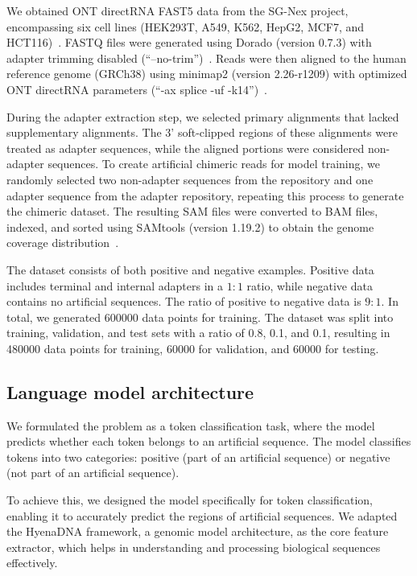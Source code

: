 \documentclass[pdflatex, sn-mathphys-num, lineno]{sn-jnl}%
\theoremstyle{thmstyleone}%
\theoremstyle{thmstyletwo}%
\theoremstyle{thmstylethree}%
\begin{document}
We obtained ONT directRNA FAST5 data from the SG-Nex project, encompassing six cell lines (HEK293T, A549, K562, HepG2, MCF7, and HCT116)~\cite{chen2021systematic}.
FASTQ files were generated using Dorado (version 0.7.3) with adapter trimming disabled (``--no-trim'')~\cite{dorado2023}.
Reads were then aligned to the human reference genome (GRCh38) using minimap2 (version 2.26-r1209) with optimized ONT directRNA parameters (``-ax splice -uf -k14'')~\cite{li2018minimap2}.

During the adapter extraction step, we selected primary alignments that lacked supplementary alignments.
The 3' soft-clipped regions of these alignments were treated as adapter sequences, while the aligned portions were considered non-adapter sequences.
To create artificial chimeric reads for model training, we randomly selected two non-adapter sequences from the repository and one adapter sequence from the adapter repository, repeating this process to generate the chimeric dataset.
The resulting SAM files were converted to BAM files, indexed, and sorted using SAMtools (version 1.19.2) to obtain the genome coverage distribution~\cite{li2009sequence}.


The dataset consists of both positive and negative examples.
Positive data includes terminal and internal adapters in a \( 1:1 \) ratio, while negative data contains no artificial sequences.
The ratio of positive to negative data is \( 9:1 \).
In total, we generated \num{600000} data points for training.
The dataset was split into training, validation, and test sets with a ratio of  \num{0.8}, \num{0.1}, and \num{0.1}, resulting in \num{480000} data points for training, \num{60000} for validation, and \num{60000} for testing.


\subsection{Language model architecture}\label{ssec:lm}

We formulated the problem as a token classification task, where the model predicts whether each token belongs to an artificial sequence.
The model classifies tokens into two categories: positive (part of an artificial sequence) or negative (not part of an artificial sequence).

To achieve this, we designed the model specifically for token classification, enabling it to accurately predict the regions of artificial sequences.
We adapted the HyenaDNA framework, a genomic model architecture, as the core feature extractor, which helps in understanding and processing biological sequences effectively.
\end{document}
